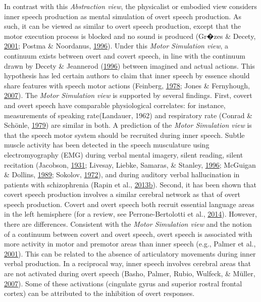 \documentclass[a4paper,12pt,twoside,openright,oldfontcommands]{memoir}
\begin{document}
In contrast with this \emph{Abstraction view}, the physicalist or embodied view considers inner speech production as mental simulation of overt speech production. As such, it can be viewed as similar to overt speech production, except that the motor execution process is blocked and no sound is produced (Gr�zes \& Decety, \protect\hyperlink{ref-grzes_functional_2001}{2001}; Postma \& Noordanus, \protect\hyperlink{ref-postma_production_1996}{1996}). Under this \emph{Motor Simulation view}, a continuum exists between overt and covert speech, in line with the continuum drawn by Decety \& Jeannerod (\protect\hyperlink{ref-decety_mentally_1996}{1996}) between imagined and actual actions. This hypothesis has led certain authors to claim that inner speech by essence should share features with speech motor actions (Feinberg, \protect\hyperlink{ref-feinberg_efference_1978}{1978}; Jones \& Fernyhough, \protect\hyperlink{ref-Jones2007}{2007}). The \emph{Motor Simulation view} is supported by several findings. First, covert and overt speech have comparable physiological correlates: for instance, measurements of speaking rate(Landauer, 1962) and respiratory rate (Conrad \& Schönle, \protect\hyperlink{ref-conrad_speech_1979}{1979}) are similar in both. A prediction of the \emph{Motor Simulation view} is that the speech motor system should be recruited during inner speech. Subtle muscle activity has been detected in the speech musculature using electromyography (EMG) during verbal mental imagery, silent reading, silent recitation (Jacobson, \protect\hyperlink{ref-jacobson_electrical_1931}{1931}; Livesay, Liebke, Samaras, \& Stanley, \protect\hyperlink{ref-livesay_covert_1996}{1996}; McGuigan \& Dollins, \protect\hyperlink{ref-mcguigan_patterns_1989}{1989}; Sokolov, \protect\hyperlink{ref-sokolov_inner_1972}{1972}), and during auditory verbal hallucination in patients with schizophrenia (Rapin et al., \protect\hyperlink{ref-Rapin2013}{2013}\protect\hyperlink{ref-Rapin2013}{b}). Second, it has been shown that covert speech production involves a similar cerebral network as that of overt speech production. Covert and overt speech both recruit essential language areas in the left hemisphere (for a review, see Perrone-Bertolotti et al., \protect\hyperlink{ref-Perrone-Bertolotti2014}{2014}). However, there are differences. Consistent with the \emph{Motor Simulation view} and the notion of a continuum between covert and overt speech, overt speech is associated with more activity in motor and premotor areas than inner speech (e.g., Palmer et al., \protect\hyperlink{ref-palmer_event-related_2001}{2001}). This can be related to the absence of articulatory movements during inner verbal production. In a reciprocal way, inner speech involves cerebral areas that are not activated during overt speech (Basho, Palmer, Rubio, Wulfeck, \& Müller, \protect\hyperlink{ref-basho_effects_2007}{2007}). Some of these activations (cingulate gyrus and superior rostral frontal cortex) can be attributed to the inhibition of overt responses.
\end{document}
